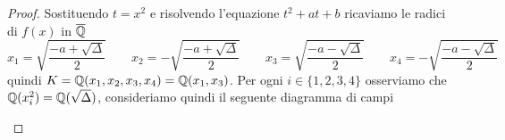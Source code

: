\documentclass[11pt]{scrartcl}
\begin{document}
	\begin{proof}
		Sostituendo $t = x^2$ e risolvendo l'equazione $t^2 + at + b$ ricaviamo
		le radici di $f(x)$ in $\overline{\mathbb Q}$
		\[
		x_1 = \sqrt{\frac{-a + \sqrt{\Delta}}{2}}\qquad 
		x_2 = -\sqrt{\frac{-a + \sqrt{\Delta}}{2}}\qquad
		x_3 = \sqrt{\frac{-a - \sqrt{\Delta}}{2}}\qquad
		x_4 = -\sqrt{\frac{-a - \sqrt{\Delta}}{2}}
		\]
		quindi $K = \mathbb Q(x_1, x_2, x_3, x_4) = \mathbb Q(x_1, x_3)$. Per ogni $i \in
		\{1, 2, 3, 4\}$ osserviamo che $\mathbb Q(x_i^2) = \mathbb Q(\sqrt{\Delta})$,
		consideriamo quindi il seguente diagramma di campi 
		\begin{center}
\end{center}
\end{proof}
\end{document}
